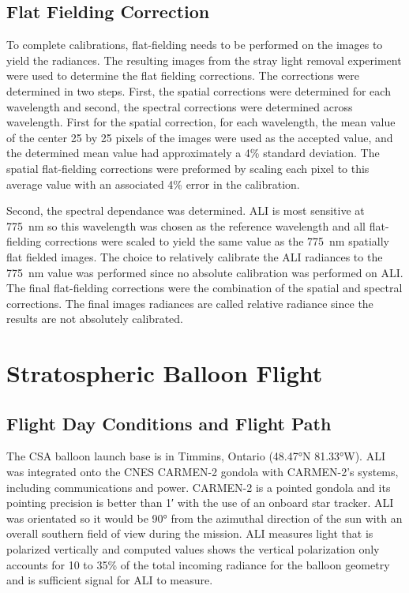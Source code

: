 \documentclass[12pt]{article}
\begin{document}
\subsection{Flat Fielding Correction}

To complete calibrations, flat-fielding needs to be performed on the images to yield the radiances. The resulting images from the stray light removal experiment were used to determine the flat fielding corrections. The corrections were determined in two steps. First, the spatial corrections were determined for each wavelength and second, the spectral corrections were determined across wavelength. First for the spatial correction, for each wavelength, the mean value of the center 25 by 25 pixels of the images were used as the accepted value, and the determined mean value had approximately a 4\% standard deviation. The spatial flat-fielding corrections were preformed by scaling each pixel to this average value with an associated 4\% error in the calibration.

Second, the spectral dependance was determined. ALI is most sensitive at 775~nm so this wavelength was chosen as the reference wavelength and all flat-fielding corrections were scaled to yield the same value as the 775~nm spatially flat fielded images. The choice to relatively calibrate the ALI radiances to the 775~nm value was performed since no absolute calibration was performed on ALI. The final flat-fielding corrections were the combination of the spatial and spectral corrections. The final images radiances are called relative radiance since the results are not absolutely calibrated.

\section{Stratospheric Balloon Flight}

\subsection{Flight Day Conditions and Flight Path}

The CSA balloon launch base is in Timmins, Ontario (48.47\si{\degree}N 81.33\si{\degree}W). ALI was integrated onto the CNES CARMEN-2 gondola with CARMEN-2's systems, including communications and power. CARMEN-2 is a pointed gondola and its pointing precision is better than 1\si{\arcminute} with the use of an onboard star tracker. ALI was orientated so it would be 90\si{\degree} from the azimuthal direction of the sun with an overall southern field of view during the mission. ALI measures light that is polarized vertically and computed values shows the vertical polarization only accounts for 10 to 35\% of the total incoming radiance for the balloon geometry and is sufficient signal for ALI to measure.
\end{document}
